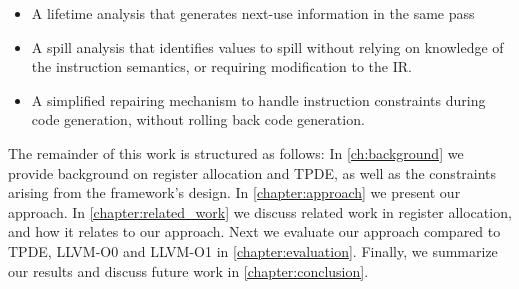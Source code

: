 \begin{itemize}
    \item A lifetime analysis that generates next-use information in the same pass
    \item A spill analysis that identifies values to spill without relying on knowledge of the instruction semantics, or requiring modification to the IR.
    \item A simplified repairing mechanism to handle instruction constraints during code generation, without rolling back code generation.
\end{itemize}

The remainder of this work is structured as follows: In \autoref{ch:background} we provide background on register allocation and TPDE, as well as the constraints arising from the framework’s design. In \autoref{chapter:approach} we present our approach. In \autoref{chapter:related_work} we discuss related work in register allocation, and how it relates to our approach. Next we evaluate our approach compared to TPDE, LLVM-O0 and LLVM-O1 in \autoref{chapter:evaluation}. Finally, we summarize our results and discuss future work in \autoref{chapter:conclusion}.